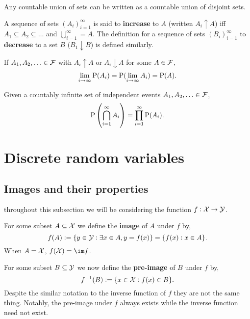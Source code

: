 \documentclass[../Year1/Year1.tex]{subfiles}
\begin{document}
\begin{lemma}
    Any countable union of sets can be written as a countable union of disjoint sets.
\end{lemma}

\begin{definition}
    A sequence of sets $(A_i)_{i=1}^\infty$ is said to \textbf{increase} to $A$ (written $A_i \uparrow A$) iff $A_1 \subseteq A_2 \subseteq \ldots$ and $\bigcup\limits_{i=1}^\infty = A$. The definition for a sequence of sets $(B_i)_{i=1}^\infty$ to \textbf{decrease} to a set $B$ ($B_1 \downarrow B$) is defined similarly.
\end{definition}

\begingroup\belowdisplayskip=-10pt
\begin{theorem}
    If $A_1, A_2, \ldots \in \FFF$ with $A_i \uparrow A$ or $A_i \downarrow A$ for some $A \in \FFF$, \[
        \lim_{i\rightarrow\infty}\P(A_i) = \P(\lim_{i\rightarrow\infty}A_i) = \P(A)
    \textcolor{black}{.}\]
\end{theorem}
\endgroup

\begingroup\belowdisplayskip=-20pt\abovedisplayskip=-10pt
\begin{theorem}
    Given a countably infinite set of independent events $A_1, A_2, \ldots \in \FFF$, \[
     \P\left(\bigcap_{i=1}^\infty{A_i}\right) = \prod_{i=1}^\infty\P(A_i)\textcolor{black}{.}
    \]
\end{theorem}
\endgroup

\section{Discrete random variables}
\subsection{Images and their properties}
throughout this subsection we will be considering the function $f:\XXX \rightarrow \YYY$.
\begin{definition}[Image]
    For some subset $A \subseteq \XXX$ we define the \textbf{image} of $A$ under $f$ by, \[
        f(A) := \{y \in \YYY: \exists x \in A, y = f(x)\} = \{f(x): x \in A\} \textcolor{black}{.}
    \]
When $A = \XXX$, $f(\XXX) = \im f$.
\end{definition}

\begin{definition}
    For some subset $B \subseteq \YYY$ we now define the \textbf{pre-image} of $B$ under $f$ by, \[
    f^{-1}(B) := \{x\in\XXX: f(x) \in B\} \textcolor{black}{.}
    \]
Despite the similar notation to the inverse function of $f$ they are not the same thing. Notably, the pre-image under $f$ always exists while the inverse function need not exist.
\end{definition}
\end{document}
